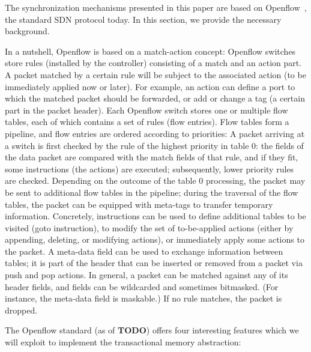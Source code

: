 \documentclass[conference]{sigcomm-alternate}
\begin{document}
The synchronization mechanisms presented in this paper
are based on Openflow~\cite{of-spec}, the standard SDN protocol today. In this section,
we provide the necessary background.

In a nutshell,
Openflow
is based on a match-action concept: Openflow switches store
rules (installed by the controller) consisting of a match and an
action part. A packet matched by a certain rule will be subject
to the associated action (to be immediately applied now or later).
For example, an action can define a port to which the
matched packet should be forwarded, or add or change a tag
(a certain part in the packet header).
Each Openflow switch stores one or multiple flow tables,
each of which contains a set of rules (flow entries). Flow
tables form a pipeline, and flow entries are ordered according
to priorities: A packet arriving at a switch is first checked by
the rule of the highest priority in table 0: the fields of the
data packet are compared with the match fields of that rule,
and if they fit, some instructions (the actions) are executed;
subsequently, lower priority rules are checked. Depending on
the outcome of the table 0 processing, the packet may be sent
to additional flow tables in the pipeline; during the traversal of
the flow tables, the packet can be equipped with meta-tags to
transfer temporary information. Concretely, instructions can be
used to define additional tables to be visited (goto instruction),
to modify the set of to-be-applied actions (either by appending,
deleting, or modifying actions), or immediately apply some
actions to the packet. A meta-data field can be used to exchange
information between tables; it is part of the header that can be
inserted or removed from a packet via push and pop actions.
In general, a packet can be matched against any of its header
fields, and fields can be wildcarded and sometimes bitmasked.
(For instance, the meta-data field is maskable.) If no rule
matches, the packet is dropped.

The Openflow standard (as of \textbf{TODO}) offers four interesting
features which we will exploit to implement the transactional memory abstraction:
\end{document}
